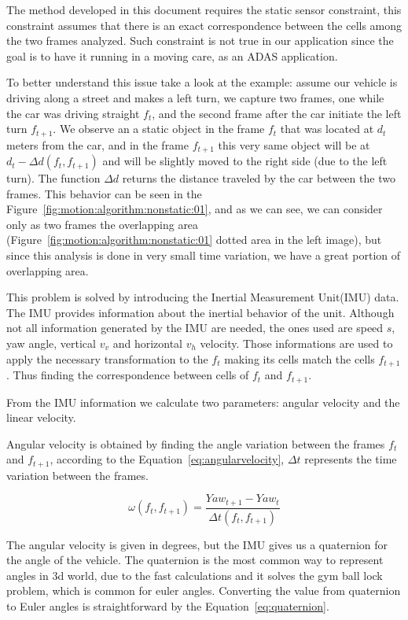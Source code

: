 The method developed in this document requires the static sensor constraint, this constraint assumes that there is an exact correspondence between the cells among the two frames analyzed. Such constraint is not true in our application since the goal is to have it running in a moving care, as an ADAS application. 

To better understand this issue take a look at the example: assume our vehicle is driving along a street and makes a left turn, we capture two frames, one while the car was driving straight $f_t$, and the second frame  after the car initiate the left turn $f_{t+1}$. We observe an a static object in the frame $f_t$ that was located at $d_t$ meters from the car, and in the frame $f_{t+1}$ this very same object will be at $d_t-\Delta d(f_t,f_{t+1})$ and will be slightly moved to the right side (due to the left turn). The function $\Delta d$ returns the distance traveled by the car between the two frames. This behavior can be seen in the Figure~\ref{fig:motion:algorithm:nonstatic:01}, and as we can see, we can consider only as two frames the overlapping area (Figure~\ref{fig:motion:algorithm:nonstatic:01} dotted area in the left image), but since this analysis is done in very small time variation, we have a great portion of overlapping area.

This problem is solved by introducing the Inertial Measurement Unit(IMU) data. The IMU provides information about the inertial behavior of the unit. Although not all information generated by the IMU are needed, the ones used are speed $s$, yaw angle, vertical $v_v$ and horizontal $v_h$ velocity. Those informations are used to apply the necessary transformation to the $f_t$ making its cells match the cells $f_{t+1}$. Thus finding the correspondence between cells of $f_t$ and $f_{t+1}$.

From the IMU information we calculate two parameters: angular velocity and the linear velocity. 

Angular velocity is obtained by finding the angle variation between the frames $f_t$ and $f_{t+1}$, according to the Equation~\ref{eq:angularvelocity}, $\Delta t$ represents the time variation between the frames.

\begin{equation}
\label{eq:angularvelocity}
\omega(f_t,f_{t+1}) = \frac{Yaw_{t+1}-Yaw_t}{\Delta t(f_t,f_{t+1})} 
\end{equation} 

The angular velocity is given in degrees, but the IMU gives us a quaternion for the angle of the vehicle. The quaternion is the most common way to represent angles in 3d world, due to the fast calculations and it solves the gym ball lock problem, which is common for euler angles. Converting the value from quaternion to Euler angles is straightforward by the Equation~\ref{eq:quaternion}.

